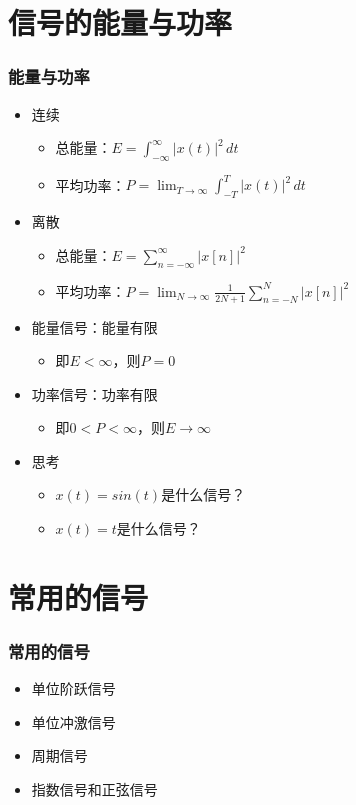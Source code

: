 \documentclass[CJKutf8,xcolor=pdftex,dvipsnames,table]{beamer}
\begin{document}
\begin{CJK*}{UTF8}{song}
  \section{信号的能量与功率}
  
  \begin{frame}
    \frametitle{能量与功率}
    \begin{itemize}
    \item 连续
        \begin{itemize}
        \item 总能量：$E=\int_{-\infty}^{\infty} |x(t)|^2 \,dt$
        \item 平均功率：$P=\lim_{T\to\infty} \int_{-T}^{T} |x(t)|^2 \,dt $
        \end{itemize}
    \end{itemize}
    \begin{itemize}
    \item 离散   
        \begin{itemize}
        \item 总能量：$E=\sum_{n=-\infty}^{\infty}|x[n]|^2$
        \item 平均功率：$P=\lim_{N\to\infty}\frac{1}{2N+1}\sum_{n=-N}^{N}|x[n]|^2$
        \end{itemize}
    \item 能量信号：能量有限
        \begin{itemize}
        \item 即$E<\infty$，则$P=0$
        \end{itemize}
    \item 功率信号：功率有限
        \begin{itemize}
        \item 即$0<P<\infty$，则$E\to\infty$
        \end{itemize}
    \item 思考
        \begin{itemize}
        \item $x(t)=sin(t)$是什么信号？
        \item $x(t)=t$是什么信号？
        \end{itemize}
    \end{itemize}
  \end{frame}  
  
  \section{常用的信号}
  
  \begin{frame}
    \frametitle{常用的信号}
    \begin{itemize}
    \item 单位阶跃信号
    \item 单位冲激信号   
    \item 周期信号
    \item 指数信号和正弦信号
    \end{itemize}
  \end{frame}  


\end{CJK*}
\end{document}
